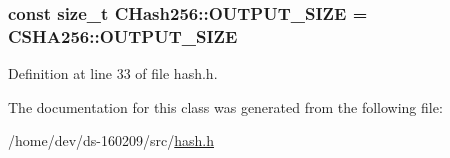 \subsubsection[{O\+U\+T\+P\+U\+T\+\_\+\+S\+I\+Z\+E}]{\setlength{\rightskip}{0pt plus 5cm}const size\+\_\+t C\+Hash256\+::\+O\+U\+T\+P\+U\+T\+\_\+\+S\+I\+Z\+E = C\+S\+H\+A256\+::\+O\+U\+T\+P\+U\+T\+\_\+\+S\+I\+Z\+E\hspace{0.3cm}{\ttfamily [static]}}\label{class_c_hash256_a6812a40441acb1c3b7f10c7e38c7d467}


Definition at line 33 of file hash.\+h.



The documentation for this class was generated from the following file\+:\begin{DoxyCompactItemize}
\item 
/home/dev/ds-\/160209/src/\hyperlink{hash_8h}{hash.\+h}\end{DoxyCompactItemize}

